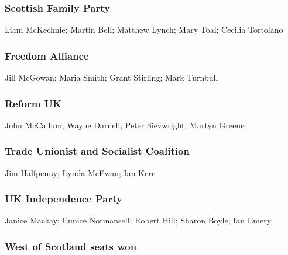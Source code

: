 \begin{resultsiii}
	\subsubsection*{Scottish Family Party}
	Liam McKechnie; Martin Bell; Matthew Lynch; Mary Toal; Cecilia Tortolano
	
	\subsubsection*{Freedom Alliance}
	Jill McGowan; Maria Smith; Grant Stirling; Mark Turnbull
	
	\subsubsection*{Reform UK}
	John McCallum; Wayne Darnell; Peter Sievwright; Martyn Greene
	
	\subsubsection*{Trade Unionist and Socialist Coalition}
	Jim Halfpenny; Lynda McEwan; Ian Kerr
	
	\subsubsection*{UK Independence Party}
	Janice Mackay; Eunice Normansell; Robert Hill; Sharon Boyle; Ian Emery
\end{resultsiii}

\vfill\eject

\subsubsection*{West of Scotland seats won}

